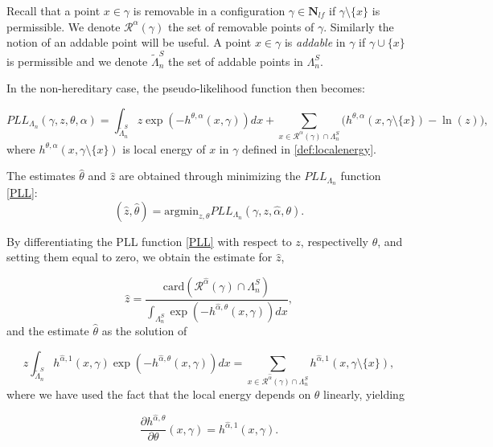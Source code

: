 Recall that a point $x\in\gamma$ is removable in a configuration $\gamma\in\mathbf N_{lf}$ if $\gamma\setminus\{x\}$ is permissible. We denote $\mathcal R^\alpha(\gamma)$ the set of removable points of $\gamma$. Similarly the notion of an addable point will be useful. A point $x\in\gamma$ is \textit{addable} in $\gamma$ if $\gamma \cup \{x\}$ is permissible and we denote $\tilde\Lambda^S_n$ the set of addable points in $\Lambda^S_n$. 

In the non-hereditary case, the pseudo-likelihood function then becomes:

\begin{equation}\label{PLL}
	PLL_{\Lambda_n}(\gamma,z,\theta, \alpha) = \int_{\tilde\Lambda^S_n} z \exp (-h^{\theta,\alpha}(x,\gamma)) dx + \sum_{x\in\mathcal R^\alpha(\gamma)\cap \Lambda^S_n} \big(h^{\theta,\alpha}(x,\gamma\setminus\{x\}) - \ln(z)\big),
\end{equation}
where $h^{\theta,\alpha}(x, \gamma \setminus \{x\})$ is local energy of $x$ in $\gamma$ defined in \ref{def:localenergy}. 

The estimates $\hat\theta$ and $\hat z$ are obtained through minimizing the $PLL_{\Lambda_n}$ function \ref{PLL}:
$$(\hat z, \hat\theta) = \text{argmin}_{z,\theta} PLL_{\Lambda_n} (\gamma, z, \hat\alpha,\theta).$$

By  differentiating the PLL function \ref{PLL} with respect to $z$, respectivelly $\theta$, and setting them equal to zero, we obtain the estimate for $\hat z$,

\begin{equation}\label{z_hat}
	\hat z = \frac{\mbox{card}(\mathcal R^{\hat\alpha}(\gamma)\cap \Lambda^S_n)}{\int_{\Lambda^S_n} \exp{\left( -h^{\hat\alpha,\theta}(x,\gamma)\right)} dx},
\end{equation}
and the estimate $\hat\theta$ as the solution of

\begin{equation}\label{theta_hat} 
	z \int_{\tilde\Lambda^S_n}  h^{\hat\alpha,1}(x,\gamma)\exp{\left(-h^{\hat\alpha,\theta}(x,\gamma)\right)} dx = \sum_{x \in \mathcal R^{\hat\alpha}(\gamma)\cap \Lambda^S_n} h^{\hat\alpha,1}(x,\gamma\setminus\{x\}),
\end{equation}
where we have used the fact that the local energy depends on $\theta$ linearly, yielding

$$\frac{\partial h^{\hat\alpha,\theta}}{\partial \theta} (x,\gamma) = h^{\hat\alpha,1}(x,\gamma).$$


